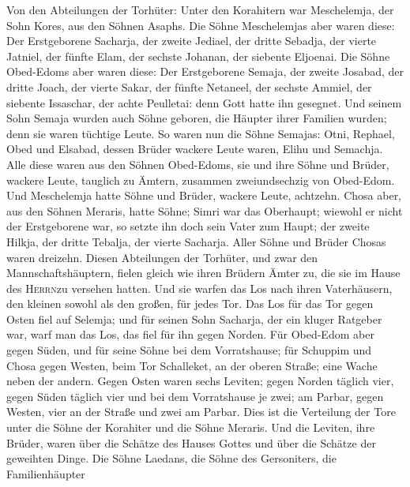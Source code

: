  Von den Abteilungen der Torhüter: Unter den Korahitern
war Meschelemja, der Sohn Kores, aus den Söhnen Asaphs. 
Die Söhne Meschelemjas aber waren diese: Der Erstgeborene Sacharja, der
zweite Jediael, der dritte Sebadja, der vierte Jatniel, 
der fünfte Elam, der sechste Johanan, der siebente Eljoenai.
 Die Söhne Obed-Edoms aber waren diese: Der Erstgeborene
Semaja, der zweite Josabad, der dritte Joach, der vierte Sakar, der
fünfte Netaneel,  der sechste Ammiel, der siebente
Issaschar, der achte Peulletai: denn Gott hatte ihn gesegnet.
 Und seinem Sohn Semaja wurden auch Söhne geboren, die
Häupter ihrer Familien wurden; denn sie waren tüchtige Leute.
 So waren nun die Söhne Semajas: Otni, Rephael, Obed und
Elsabad, dessen Brüder wackere Leute waren, Elihu und Semachja.
 Alle diese waren aus den Söhnen Obed-Edoms, sie und ihre
Söhne und Brüder, wackere Leute, tauglich zu Ämtern, zusammen
zweiundsechzig von Obed-Edom.  Und Meschelemja hatte Söhne
und Brüder, wackere Leute, achtzehn.  Chosa aber, aus den
Söhnen Meraris, hatte Söhne; Simri war das Oberhaupt; wiewohl er nicht
der Erstgeborene war, so setzte ihn doch sein Vater zum Haupt;
 der zweite Hilkja, der dritte Tebalja, der vierte
Sacharja. Aller Söhne und Brüder Chosas waren dreizehn. 
Diesen Abteilungen der Torhüter, und zwar den Mannschaftshäuptern,
fielen gleich wie ihren Brüdern Ämter zu, die sie im Hause des
\textsc{Herrn}zu versehen hatten.  Und sie warfen das Los
nach ihren Vaterhäusern, den kleinen sowohl als den großen, für jedes
Tor.  Das Los für das Tor gegen Osten fiel auf Selemja;
und für seinen Sohn Sacharja, der ein kluger Ratgeber war, warf man das
Los, das fiel für ihn gegen Norden.  Für Obed-Edom aber
gegen Süden, und für seine Söhne bei dem Vorratshause; 
für Schuppim und Chosa gegen Westen, beim Tor Schalleket, an der oberen
Straße; eine Wache neben der andern.  Gegen Osten waren
sechs Leviten; gegen Norden täglich vier, gegen Süden täglich vier und
bei dem Vorratshause je zwei;  am Parbar, gegen Westen,
vier an der Straße und zwei am Parbar.  Dies ist die
Verteilung der Tore unter die Söhne der Korahiter und die Söhne Meraris.
 Und die Leviten, ihre Brüder, waren über die Schätze des
Hauses Gottes und über die Schätze der geweihten Dinge. 
Die Söhne Laedans, die Söhne des Gersoniters, die Familienhäupter
